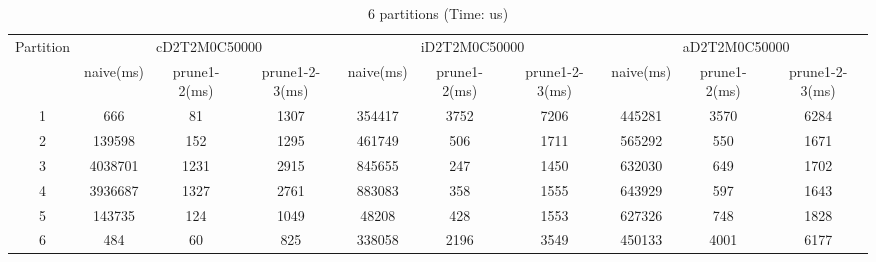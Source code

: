 
\clearpage

\vspace*{50pt}
\begin{table*}[t]
  \centering
\makeatletter
    \long{}
\makeatother
  \caption{6 partitions (Time: us)}
    \vspace*{3pt}
  \footnotesize

  \label{table:partition6}
  \begin{tabular}{|c||c|c|c|c|c|c|c|c|c|}
  \hline
  \multirow{2}{*}{Partition} &  \multicolumn{3}{|c|}{cD2T2M0C50000} & \multicolumn{3}{|c|}{iD2T2M0C50000} &\multicolumn{3}{|c|}{aD2T2M0C50000} \\\cline{2-10}
    &  naive(ms) & prune1-2(ms) & prune1-2-3(ms) & naive(ms) & prune1-2(ms) & prune1-2-3(ms) & naive(ms) & prune1-2(ms) & prune1-2-3(ms) \\\hline \hline

\cline{2-10}
    1 &  666 & 81 & 1307 & 354417 & 3752 & 7206 & 445281  & 3570 & 6284 \\\hline

\cline{2-10}
    2 &  139598 & 152 & 1295 & 461749 & 506 & 1711 & 565292 & 550 & 1671 \\\hline

\cline{2-10}
    3 &  4038701 & 1231 & 2915 & 845655 & 247 & 1450 & 632030 & 649 & 1702 \\\hline
    
\cline{2-10}
    4 &  3936687 & 1327 & 2761 & 883083 & 358 & 1555 & 643929 & 597 & 1643 \\\hline
    
\cline{2-10}
    5 &  143735 & 124 & 1049 & 48208 &  428 & 1553 & 627326 & 748 & 1828 \\\hline
    
\cline{2-10}
    6 &  484 & 60 & 825 & 338058 & 2196 & 3549 & 450133 & 4001 & 6177 \\\hline

  \end{tabular}
  \vspace*{-17pt}
\end{table*}




